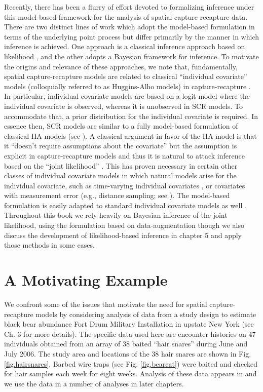 Recently, there has been a flurry of effort devoted to formalizing
inference under this model-based framework for the analysis of spatial
capture-recapture data. There are two distinct lines of work which
adopt the model-based formulation in terms of the underlying point
process but differ primarily by the manner in which inference is
achieved. One approach is a classical inference approach based on
likelihood \citep{borchers_efford:2008}, and the other adopts a
Bayesian framework for inference. To motivate the origins and
relevance of these approaches, we note that, fundamentally, spatial
capture-recapture models are related to classical ``individual
covariate'' models (colloquially referred to as Huggins-Alho 
models) in capture-recapture \citep{huggins:1989, alho:1990}.
In particular, individual covariate models 
are based on a logit model where the
individual covariate is observed, whereas it is unobserved in SCR
models. To accommodate that, a prior distribution for the individual
covariate is required. In essence then, SCR models are similar to a
fully model-based formulation of classical HA models (see
\citet{royle:2009}). A classical argument in favor of the HA model is
that it ``doesn't require assumptions about the covariate'' but the
assumption is explicit in capture-recapture models and thus it is
natural to attack inference based on the ``joint likelihood''
\citep{borchers_etal:2002}. This has proven necessary in certain other
classes of individual covariate models in which natural models arise
for the individual covariate, such as time-varying individual
covariates \citep{bonner_schwarz:2006}, or covariates with measurement
error (e.g., distance sampling; see
\citet[][ch. 7]{royle_dorazio:2008}). 
The model-based formulation is easily adapted to standard
individual covariate models as well \citep{royle:2008}. Throughout
this book we rely heavily on Bayesian inference of the joint
likelihood, using the formulation based on data-augmentation
\citep{royle_etal:2007, royle_young:2008, royle:2009} though we also
discuss the development of likelihood-based inference in chapter 5 and
apply those methods in some cases.


\section{ A Motivating Example }
 
We confront some of the issues that motivate the need for spatial
capture-recapture models by considering analysis of data from a study
design to estimate black bear abundance Fort Drum Military
Installation in upstate New York (see Ch. 3 for more details). The
specific data used here are encounter histories on 47 individuals
obtained from an array of 38 baited ``hair snares'' during June and
July 2006. The study area and locations of the 38 hair snares are
shown in Fig. \ref{fig.hairsnares}.  Barbed wire traps (see
Fig. \ref{fig.bearcat}) were baited and checked for hair samples each
week for eight weeks.  Analysis of these data appears in
\citet{gardner_etal:2010} and we use the data in a number of analyses
in later chapters.

